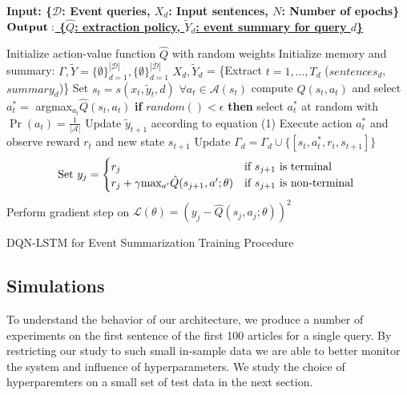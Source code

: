 \documentclass[12pt]{article}
\begin{document}
\begin{algorithm}
    \bf{Input:} { \rm  \{$\mathcal{D}$: Event queries, $X_d$: Input sentences, $N$: Number of epochs\} } \\
    \underline{$\bf{Output: }$ \rm \{$\hat{Q}$: extraction policy, $\tilde{Y}_d$: event summary for query $d$\} }
\begin{algorithmic}[1]
\STATE \rm Initialize action-value function $\hat{Q}$ with random weights
\STATE \rm Initialize memory and summary: $\Gamma, \tilde{Y} =  \{\emptyset \}^{\mathcal{|D|}}_{d=1},  \{\emptyset \}^{\mathcal{|D|}}_{d=1} $
		\STATE $X_{d}, \tilde{Y}_{d}$ = \{Extract $t=1,...,T_d$ ($sentences_d$, $summary_d$)\}
			\STATE Set $s_t = s(x_t, \tilde{y}_t, d)$
			\STATE $ \forall a_t \in \mathcal{A}(s_t)$ \textrm{compute} $\hat{Q}(s_t, a_t)$ and select $a^{*}_t =$ argmax$_{a_{t}}\hat{Q}(s_t, a_t)$
			\STATE  \textbf{if} $random() < \epsilon$ \textbf{then} select $a^{*}_t $ at random with $\Pr(a_t) =\frac{1}{| \mathcal{A} |} $
			\STATE Update $\tilde{y}_{t+1}$ according to equation (1)
			\STATE Execute action $a^{*}_t$ and observe reward $r_t$ and new state $s_{t+1}$
			\STATE Update $\Gamma_d = \Gamma_d \cup \{ [s_t, a^{*}_t, r_t, s_{t+1}]\}$
		\ENDFOR
	\ENDFOR
			\STATE \[\textrm{Set } y_j =
					\begin{cases}
						r_j              								& \text{if $s_{j+1}$ is terminal } \\
					     	r_j + \gamma $max$_{a'}\hat{Q}(s_{j+1}, a'; \theta) 	& \text{if $s_{j+1}$ is non-terminal } 
					\end{cases} 
					\]
        			\STATE Perform gradient step on $\mathcal{L}(\theta) = (y_j - \hat{Q}(s_j, a_j; \theta))^2$
		\ENDFOR
\ENDFOR
  \end{algorithmic}
    \caption{DQN-LSTM for Event Summarization Training Procedure}
\end{algorithm}


\subsection{Simulations}
To understand the behavior of our architecture, we produce a number of experiments on the first sentence of the first 100 articles for a single query. By restricting our study to such small in-sample data we are able to better monitor the system and influence of hyperparameters. We study the choice of hyperparemters on a small set of test data in the next section.
\end{document}
